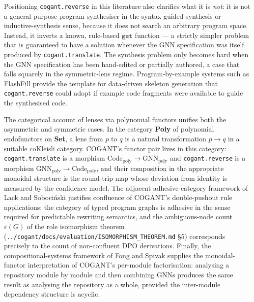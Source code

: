 \documentclass[
]{article}
\begin{document}
Positioning \texttt{cogant.reverse} in this literature also clarifies
what it is \emph{not}: it is not a general-purpose program synthesiser
in the syntax-guided synthesis \citep{alur2013sygus} or
inductive-synthesis \citep{solar2008sketching} sense, because it does
not search an arbitrary program space. Instead, it inverts a known,
rule-based \(\texttt{get}\) function --- a strictly simpler problem that
is guaranteed to have a solution whenever the GNN specification was
itself produced by \texttt{cogant.translate}. The synthesis problem only
becomes hard when the GNN specification has been hand-edited or
partially authored, a case that falls squarely in the symmetric-lens
regime. Program-by-example systems such as FlashFill
\citep{gulwani2011flashfill} provide the template for data-driven
skeleton generation that \texttt{cogant.reverse} could adopt if example
code fragments were available to guide the synthesised code.

The categorical account of lenses via polynomial functors
\citep{spivak2020poly, niu2023polynomial} unifies both the asymmetric
and symmetric cases. In the category \textbf{Poly} of polynomial
endofunctors on \textbf{Set}, a lens from \(p\) to \(q\) is a natural
transformation \(p \to q\) in a suitable coKleisli category. COGANT's
functor pair lives in this category: \texttt{cogant.translate} is a
morphism \(\text{Code}_{\text{poly}} \to \text{GNN}_{\text{poly}}\) and
\texttt{cogant.reverse} is a morphism
\(\text{GNN}_{\text{poly}} \to \text{Code}_{\text{poly}}\), and their
composition in the appropriate monoidal structure is the round-trip map
whose deviation from identity is measured by the confidence model. The
adjacent adhesive-category framework of Lack and Sobociński
\citep{lack2004adhesive} justifies confluence of COGANT's double-pushout
rule applications: the category of typed program graphs is adhesive in
the sense required for predictable rewriting semantics, and the
ambiguous-node count \(\varepsilon(G)\) of the role isomorphism theorem
(\texttt{../cogant/docs/evaluation/ISOMORPHISM\_THEOREM.md} §5)
corresponds precisely to the count of non-confluent DPO derivations.
Finally, the compositional-systems framework of Fong and Spivak
\citep{fong2019sevensketches} supplies the monoidal-functor
interpretation of COGANT's per-module factorisation: analysing a
repository module by module and then combining GNNs produces the same
result as analysing the repository as a whole, provided the inter-module
dependency structure is acyclic.

\newpage
\end{document}
